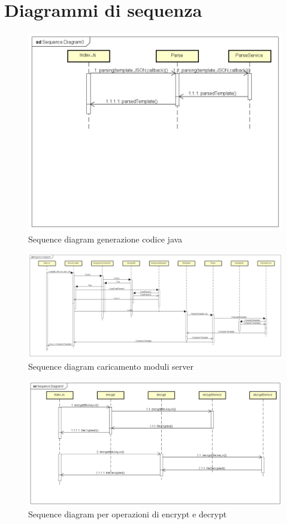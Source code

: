 \section{Diagrammi di sequenza}

\begin{figure}[h!]
			\centering
			\includegraphics[scale=0.5]{Sequence/generazioneJava.png}
			\caption{Sequence diagram generazione codice java}
 			\end{figure}
 			
 			\begin{figure}[h!]
			\centering
			\includegraphics[scale=0.2]{Sequence/serverLoading.png}
			\caption{Sequence diagram caricamento moduli server}
 			\end{figure}
 			
 			\begin{figure}[h!]
			\centering
			\includegraphics[scale=0.3]{Sequence/wncryptDecrypt.png}
			\caption{Sequence diagram per operazioni di encrypt e decrypt}
 			\end{figure}